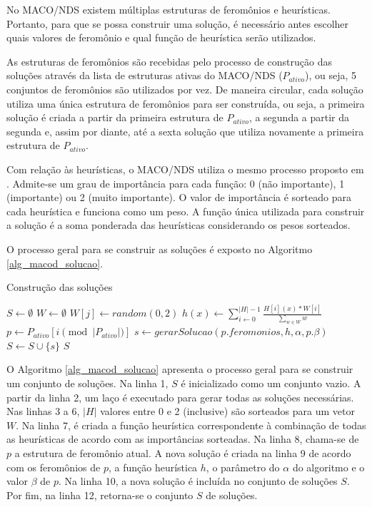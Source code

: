 No MACO/NDS existem múltiplas estruturas de feromônios e heurísticas. Portanto, para que se possa construir uma solução, é necessário antes escolher quais valores de feromônio e qual função de heurística serão utilizados. 

As estruturas de feromônios são recebidas pelo processo de construção das soluções através da lista de estruturas ativas do MACO/NDS ($P_{ativo}$), ou seja, 5 conjuntos de feromônios são utilizados por vez. De maneira circular, cada solução utiliza uma única estrutura de feromônios para ser construída, ou seja, a primeira solução é criada a partir da primeira estrutura de $P_{ativo}$, a segunda a partir da segunda e, assim por diante, até a sexta solução que utiliza novamente a primeira estrutura de $P_{ativo}$.

Com relação às heurísticas, o MACO/NDS utiliza o mesmo processo proposto em \cite{Riveros2016}. Admite-se um grau de importância para cada função: 0 (não importante), 1 (importante) ou 2 (muito importante). O valor de importância é sorteado para cada heurística e funciona como um peso. A função única utilizada para construir a solução é a soma ponderada das heurísticas considerando os pesos sorteados.

O processo geral para se construir as soluções é exposto no Algoritmo \ref{alg_macod_solucao}.

\begin{algorithm}
	\caption{Construção das soluções}
	\label{alg_macod_solucao}
	\begin{algorithmic}[1]
		\State $S \gets \emptyset$
		\State $W \gets \emptyset$
		\State $W[j] \gets random(0,2)$
		\EndFor
		\State $h(x) \gets \sum_{i \gets 0}^{|H|-1}\frac{H[i](x) * W[i]}{\sum\limits_{w \in W}w}$
		\State $p \gets P_{ativo}[i \pmod{|P_{ativo}|}]$
		\State $s \gets gerarSolucao(p.feromonios, h, \alpha, p.\beta)$
		\State $S \gets S \cup \{s\}$
		\EndFor
		\State \Return $S$
	\end{algorithmic}
\end{algorithm}

O Algoritmo \ref{alg_macod_solucao} apresenta o processo geral para se construir um conjunto de soluções. Na linha 1, $S$ é inicializado como um conjunto vazio. A partir da linha 2, um laço é executado para gerar todas as soluções necessárias. Nas linhas 3 a 6, $|H|$ valores entre 0 e 2 (inclusive) são sorteados para um vetor $W$. Na linha 7, é criada a função heurística correspondente à combinação de todas as heurísticas de acordo com as importâncias sorteadas. Na linha 8, chama-se de $p$ a estrutura de feromônio atual. A nova solução é criada na linha 9 de acordo com os feromônios de $p$, a função heurística $h$, o parâmetro do $\alpha$ do algoritmo e o valor $\beta$ de $p$. Na linha 10, a nova solução é incluída no conjunto de soluções $S$. Por fim, na linha 12, retorna-se o conjunto $S$ de soluções.

